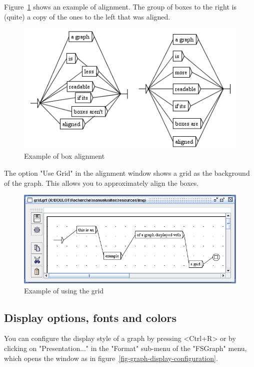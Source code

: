 \bigskip
\noindent Figure~\ref{fig-vertical-left-alignment} shows an example
of alignment. The group of boxes to the right is (quite) a copy of the ones to the
left that was aligned.

\bigskip
\begin{figure}[!h]
\begin{center}
\includegraphics[width=11.5cm]{resources/img/fig5-24.png}
\caption{Example of box alignment\label{fig-vertical-left-alignment}}
\end{center}
\end{figure}

\bigskip
\noindent The option "Use Grid" in the alignment window shows a grid as the
background of the graph. This allows you to approximately align the
boxes.

\bigskip
\begin{figure}[!h]
\begin{center}
\includegraphics[width=15cm]{resources/img/fig5-25.png}
\caption{Example of using the grid}
\end{center}
\end{figure}

\subsection{Display options, fonts and colors}
\label{section-display-fonts-colors}
You can configure the display style of a graph by pressing <Ctrl+R> or by
clicking on "Presentation..." in the "Format" sub-menu of the "FSGraph" menu,
which opens the window as in
figure~\ref{fig-graph-display-configuration}.


